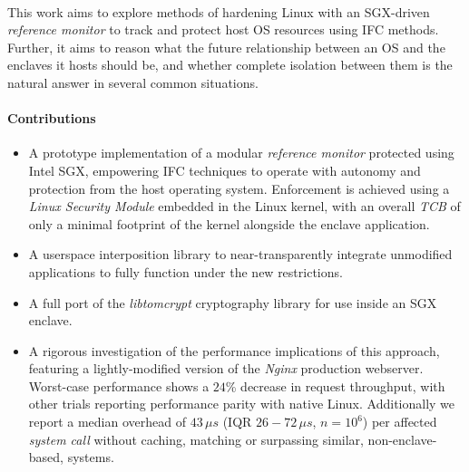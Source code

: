 \paragraph{} This work aims to explore methods of hardening Linux with an SGX-driven \textit{reference monitor} to track and protect host OS resources using IFC methods. Further, it aims to reason what the future relationship between an OS and the enclaves it hosts should be, and whether complete isolation between them is the natural answer in several common situations.


\paragraph{Contributions}
\begin{itemize}
    \item A prototype implementation of a modular \textit{reference monitor} protected using Intel SGX, empowering IFC techniques to operate with autonomy and protection from the host operating system. Enforcement is achieved using a \textit{Linux Security Module} embedded in the Linux kernel, with an overall \textit{TCB} of only a minimal footprint of the kernel alongside the enclave application.
    \item A userspace interposition library to near-transparently integrate unmodified applications to fully function under the new restrictions.
    \item A full port of the \textit{libtomcrypt} cryptography library for use inside an SGX enclave.
    \item A rigorous investigation of the performance implications of this approach, featuring a lightly-modified version of the \textit{Nginx} production webserver. Worst-case performance shows a $24$\% decrease in request throughput, with other trials reporting performance parity with native Linux. Additionally we report a median overhead of $43\,\mu s$ (IQR $26-72\,\mu s$, $n = 10^6$) per affected \textit{system call} without caching, matching or surpassing similar, non-enclave-based, systems.
\end{itemize}